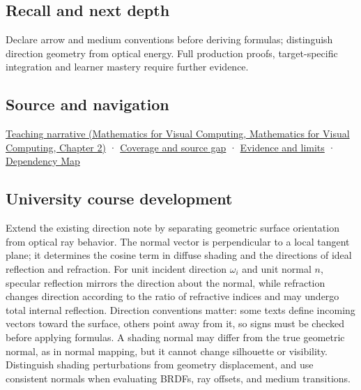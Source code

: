\subsection{Recall and next depth}\label{appendix-44e00863b4d5-recall-and-next-depth}

Declare arrow and medium conventions before deriving formulas; distinguish direction geometry from optical energy. Full production proofs, target-specific integration and learner mastery require further evidence.

\subsection{Source and navigation}\label{appendix-44e00863b4d5-source-and-navigation}

\href{../02-Mathematics-for-Visual-Computing/main.pdf\#nameddest=01-foundations-i-ch018-light-uses-the-same-decomposition-in-a-new-role}{Teaching narrative (Mathematics for Visual Computing, Mathematics for Visual Computing, Chapter 2)} · \hyperref[appendix-fd090d982a15-phase-6---parts-501-600]{Coverage and source gap} · \hyperref[appendix-a103e7846d21-phase-6---source-analysis-and-verification]{Evidence and limits} · \hyperref[appendix-4ad47bdd269a]{Dependency Map}

\subsection{University course development}\label{appendix-44e00863b4d5-university-course-development}

Extend the existing direction note by separating geometric surface orientation from optical ray behavior. The normal vector is perpendicular to a local tangent plane; it determines the cosine term in diffuse shading and the directions of ideal reflection and refraction. For unit incident direction \(\omega_i\) and unit normal \(n\), specular reflection mirrors the direction about the normal, while refraction changes direction according to the ratio of refractive indices and may undergo total internal reflection. Direction conventions matter: some texts define incoming vectors toward the surface, others point away from it, so signs must be checked before applying formulas. A shading normal may differ from the true geometric normal, as in normal mapping, but it cannot change silhouette or visibility. Distinguish shading perturbations from geometry displacement, and use consistent normals when evaluating BRDFs, ray offsets, and medium transitions.

